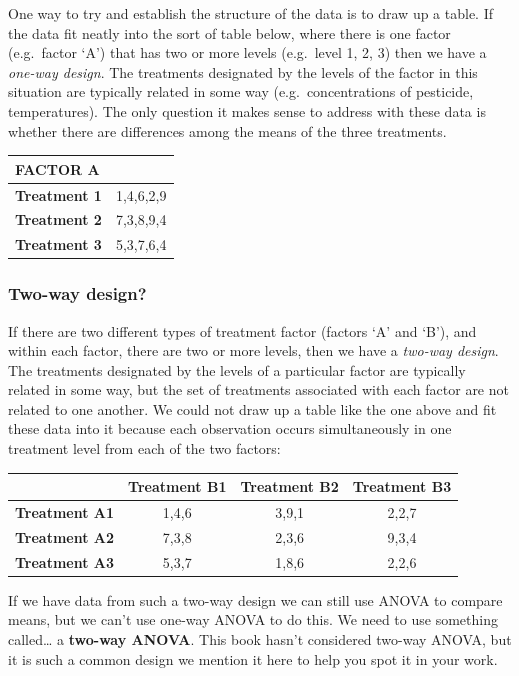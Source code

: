 \documentclass[
]{book}
\newenvironment{greybox}{
  \definecolor{shadecolor}{rgb}{0.95,0.95,0.95}  %
  \color{black}
  \begin{shaded}}
 {\end{shaded}}
\newenvironment{infobox}[1]
  {
  \begin{itemize}
  \renewcommand{\labelitemi}{
    \raisebox{-.7\height}[0pt][0pt]{
      {\setkeys{Gin}{width=3em,keepaspectratio}
        \texttt{[image: images/\#1]}}
    }
  }
  \setlength{\fboxsep}{1em}
  \begin{greybox}
  \item
  }
  {
  \end{greybox}
  \end{itemize}
  }
\begin{document}
One way to try and establish the structure of the data is to draw up a table. If the data fit neatly into the sort of table below, where there is one factor (e.g.~factor `A') that has two or more levels (e.g.~level 1, 2, 3) then we have a \emph{one-way design}. The treatments designated by the levels of the factor in this situation are typically related in some way (e.g.~concentrations of pesticide, temperatures). The only question it makes sense to address with these data is whether there are differences among the means of the three treatments.

\begin{longtable}[]{@{}lc@{}}
\toprule
\textbf{FACTOR A} & \\
\midrule
\endhead
\textbf{Treatment 1} & 1,4,6,2,9 \\
\textbf{Treatment 2} & 7,3,8,9,4 \\
\textbf{Treatment 3} & 5,3,7,6,4 \\
\bottomrule
\end{longtable}

\begin{infobox}{information}

\hypertarget{two-way-design}{%
\subsubsection*{Two-way design?}\label{two-way-design}}

If there are two different types of treatment factor (factors `A' and `B'), and within each factor, there are two or more levels, then we have a \emph{two-way design}. The treatments designated by the levels of a particular factor are typically related in some way, but the set of treatments associated with each factor are not related to one another. We could not draw up a table like the one above and fit these data into it because each observation occurs simultaneously in one treatment level from each of the two factors:

\begin{longtable}[]{@{}lccc@{}}
\toprule
& \textbf{Treatment B1} & \textbf{Treatment B2} & \textbf{Treatment B3} \\
\midrule
\endhead
\textbf{Treatment A1} & 1,4,6 & 3,9,1 & 2,2,7 \\
\textbf{Treatment A2} & 7,3,8 & 2,3,6 & 9,3,4 \\
\textbf{Treatment A3} & 5,3,7 & 1,8,6 & 2,2,6 \\
\bottomrule
\end{longtable}

If we have data from such a two-way design we can still use ANOVA to compare means, but we can't use one-way ANOVA to do this. We need to use something called\ldots{} a \textbf{two-way ANOVA}. This book hasn't considered two-way ANOVA, but it is such a common design we mention it here to help you spot it in your work.

\end{infobox}
\end{document}
